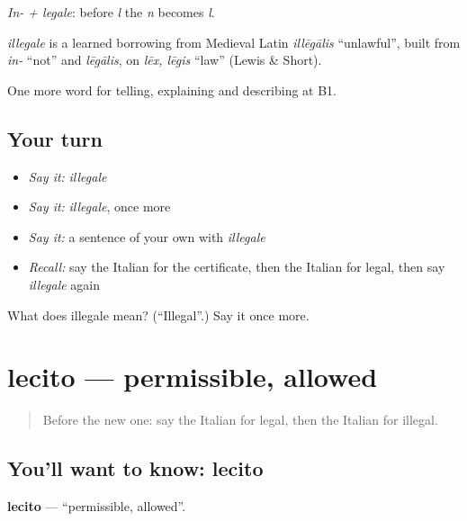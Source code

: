 \emph{In- + legale}: before \emph{l} the \emph{n} becomes \emph{l}.

\begin{cousinweb}
\emph{illegale} is a learned borrowing from Medieval Latin \emph{illēgālis} \textquotedblleft{}unlawful\textquotedblright{}, built from \emph{in-} \textquotedblleft{}not\textquotedblright{} and \emph{lēgālis}, on \emph{lēx, lēgis} \textquotedblleft{}law\textquotedblright{} (Lewis \& Short).
\end{cousinweb}

\begin{grammarlens}[title={What you've built}]
One more word for telling, explaining and describing at B1.
\end{grammarlens}

\subsection*{Your turn}
\begin{itemize}
\raggedright
  \item \emph{Say it:} \emph{illegale}
  \item \emph{Say it:} \emph{illegale}, once more
  \item \emph{Say it:} a sentence of your own with \emph{illegale}
  \item \emph{Recall:} say the Italian for the certificate, then the Italian for legal, then say \emph{illegale} again
\end{itemize}

\begin{tcolorbox}[breakable,colback=teal!4,colframe=teal!35!black,title={Before you move on}]
What does illegale mean? (\textquotedblleft{}Illegal\textquotedblright{}.) Say it once more.
\end{tcolorbox}
\section[lecito]{lecito — permissible, allowed}

\label{lesson:IT-C390-lecito}



\begin{quote}
Before the new one: say the Italian for legal, then the Italian for illegal.
\end{quote}

\subsection*{You'll want to know: lecito}
\textbf{lecito} — \textquotedblleft{}permissible, allowed\textquotedblright{}.

